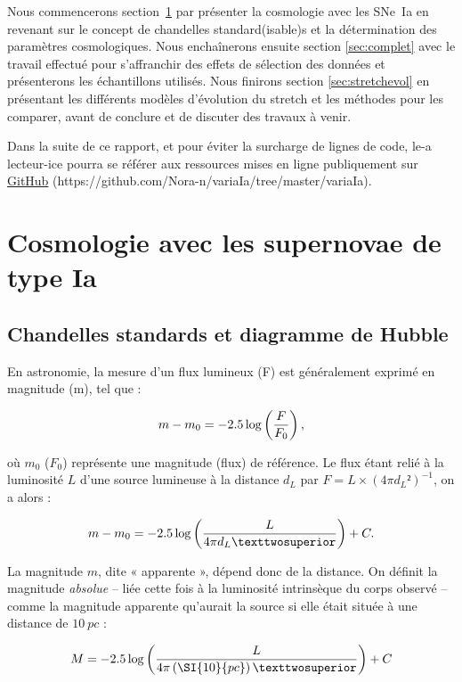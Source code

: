 \documentclass[a4paper, 12pt, svgnames]{article}
\begin{document}
Nous commencerons section~\ref{sec:cosmo} par présenter la cosmologie avec les
SNe~Ia en revenant sur le concept de chandelles standard(isable)s et la
détermination des paramètres cosmologiques. Nous enchaînerons ensuite section
\ref{sec:complet} avec le travail effectué pour s'affranchir des effets de
sélection des données et présenterons les échantillons utilisés. Nous finirons
section \ref{sec:stretchevol} en présentant les différents modèles d'évolution
du stretch et les méthodes pour les comparer, avant de conclure et de discuter
des travaux à venir. \bigbreak

Dans la suite de ce rapport, et pour éviter la surcharge de lignes de code, le-a
lecteur-ice pourra se référer aux ressources mises en ligne publiquement sur
\href{https://github.com/Nora-n/variaIa/tree/master/variaIa}{GitHub}
(https://github.com/Nora-n/variaIa/tree/master/variaIa).

\section{Cosmologie avec les supernovae de type Ia}\label{sec:cosmo}

\subsection{Chandelles standards et diagramme de Hubble}\label{ssec:hub}

En astronomie, la mesure d'un flux lumineux (F) est généralement exprimé en
magnitude (m), tel que :

\begin{equation}
    m - m_0 = -2.5\log\left(\frac{F}{F_0}\right),
\end{equation}

où $m_0$ ($F_0$) représente une magnitude (flux) de référence.
Le flux étant relié à la luminosité $L$ d'une source lumineuse à la distance
$d_L$ par $F = L\times \left(4\pi d_L²\right)^{-1}$, on a alors :

\begin{equation}
    m - m_0 = -2.5\log\LR{L}{4\pi d_L²} + C.
\end{equation}

La magnitude $m$, dite « apparente », dépend donc de la distance. On définit
la magnitude \textit{absolue} -- liée cette fois à la luminosité intrinsèque du
corps observé -- comme la magnitude apparente qu'aurait la source si elle était
située à une distance de $\SI{10}{pc}$ :

\begin{equation}
    M = -2.5\log\LR{L}{4\pi\LF{\SI{10}{pc}}²} + C
\end{equation}
\end{document}
